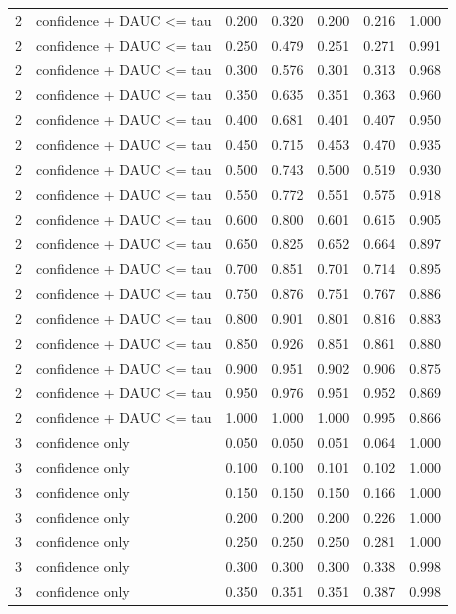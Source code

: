 \begin{tabular}{rlrrrrr}
2 & confidence + DAUC <= tau & 0.200 & 0.320 & 0.200 & 0.216 & 1.000 \\
2 & confidence + DAUC <= tau & 0.250 & 0.479 & 0.251 & 0.271 & 0.991 \\
2 & confidence + DAUC <= tau & 0.300 & 0.576 & 0.301 & 0.313 & 0.968 \\
2 & confidence + DAUC <= tau & 0.350 & 0.635 & 0.351 & 0.363 & 0.960 \\
2 & confidence + DAUC <= tau & 0.400 & 0.681 & 0.401 & 0.407 & 0.950 \\
2 & confidence + DAUC <= tau & 0.450 & 0.715 & 0.453 & 0.470 & 0.935 \\
2 & confidence + DAUC <= tau & 0.500 & 0.743 & 0.500 & 0.519 & 0.930 \\
2 & confidence + DAUC <= tau & 0.550 & 0.772 & 0.551 & 0.575 & 0.918 \\
2 & confidence + DAUC <= tau & 0.600 & 0.800 & 0.601 & 0.615 & 0.905 \\
2 & confidence + DAUC <= tau & 0.650 & 0.825 & 0.652 & 0.664 & 0.897 \\
2 & confidence + DAUC <= tau & 0.700 & 0.851 & 0.701 & 0.714 & 0.895 \\
2 & confidence + DAUC <= tau & 0.750 & 0.876 & 0.751 & 0.767 & 0.886 \\
2 & confidence + DAUC <= tau & 0.800 & 0.901 & 0.801 & 0.816 & 0.883 \\
2 & confidence + DAUC <= tau & 0.850 & 0.926 & 0.851 & 0.861 & 0.880 \\
2 & confidence + DAUC <= tau & 0.900 & 0.951 & 0.902 & 0.906 & 0.875 \\
2 & confidence + DAUC <= tau & 0.950 & 0.976 & 0.951 & 0.952 & 0.869 \\
2 & confidence + DAUC <= tau & 1.000 & 1.000 & 1.000 & 0.995 & 0.866 \\
3 & confidence only & 0.050 & 0.050 & 0.051 & 0.064 & 1.000 \\
3 & confidence only & 0.100 & 0.100 & 0.101 & 0.102 & 1.000 \\
3 & confidence only & 0.150 & 0.150 & 0.150 & 0.166 & 1.000 \\
3 & confidence only & 0.200 & 0.200 & 0.200 & 0.226 & 1.000 \\
3 & confidence only & 0.250 & 0.250 & 0.250 & 0.281 & 1.000 \\
3 & confidence only & 0.300 & 0.300 & 0.300 & 0.338 & 0.998 \\
3 & confidence only & 0.350 & 0.351 & 0.351 & 0.387 & 0.998 \\

\end{tabular}
